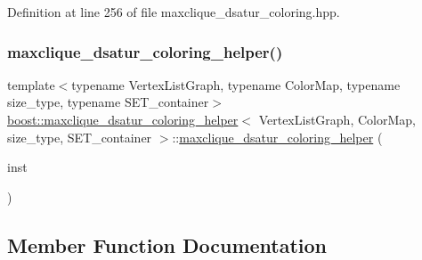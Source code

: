 Definition at line 256 of file maxclique\+\_\+dsatur\+\_\+coloring.\+hpp.

\mbox{\label{classboost_1_1maxclique__dsatur__coloring__helper_a9f8ef23ffcbea873110b5ff92c9a504f}} 
\subsubsection{\texorpdfstring{maxclique\+\_\+dsatur\+\_\+coloring\+\_\+helper()}{maxclique\_dsatur\_coloring\_helper()}\hspace{0.1cm}{\footnotesize\ttfamily [2/2]}}
{\footnotesize\ttfamily template$<$typename Vertex\+List\+Graph, typename Color\+Map, typename size\+\_\+type, typename S\+E\+T\+\_\+container$>$ \\
\hyperlink{classboost_1_1maxclique__dsatur__coloring__helper}{boost\+::maxclique\+\_\+dsatur\+\_\+coloring\+\_\+helper}$<$ Vertex\+List\+Graph, Color\+Map, size\+\_\+type, S\+E\+T\+\_\+container $>$\+::\hyperlink{classboost_1_1maxclique__dsatur__coloring__helper}{maxclique\+\_\+dsatur\+\_\+coloring\+\_\+helper} (\begin{DoxyParamCaption}\item[{const \hyperlink{classboost_1_1maxclique__dsatur__coloring__helper}{maxclique\+\_\+dsatur\+\_\+coloring\+\_\+helper}$<$ Vertex\+List\+Graph, Color\+Map, size\+\_\+type, S\+E\+T\+\_\+container $>$ \&}]{inst }\end{DoxyParamCaption})\hspace{0.3cm}{\ttfamily [delete]}}



\subsection{Member Function Documentation}
\mbox{\label{classboost_1_1maxclique__dsatur__coloring__helper_a1f9b86609393ae2e3a6c2fe178d88d40}} 
